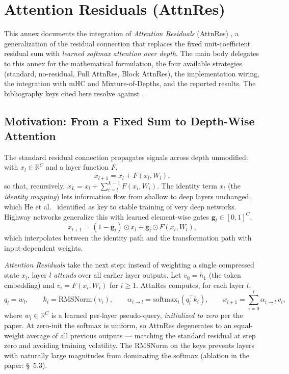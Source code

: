 \section{Attention Residuals (AttnRes)}
\label{sec:annex-attnres}

This annex documents the integration of \emph{Attention Residuals}
(AttnRes) \citep{sun_attnres_2026}, a generalization of the residual
connection that replaces the fixed unit-coefficient residual sum with
\emph{learned softmax attention over depth}. The main body delegates
to this annex for the mathematical formulation, the four available
strategies (standard, no-residual, Full AttnRes, Block AttnRes), the
implementation wiring, the integration with mHC and Mixture-of-Depths,
and the reported results. The bibliography keys cited here resolve
against .

\subsection{Motivation: From a Fixed Sum to Depth-Wise Attention}

The standard residual connection \citep{he_deep_2016} propagates signals
across depth unmodified: with $x_l \in \mathbb{R}^{C}$ and a layer
function $F$,
\[
x_{l+1} = x_l + F(x_l, W_l),
\]
so that, recursively,
$x_L = x_l + \sum_{i=l}^{L-1} F(x_i, W_i)$. The identity term $x_l$
(the \emph{identity mapping}) lets information flow from shallow to deep
layers unchanged, which He et al.~\citep{he_deep_2016} identified as key
to stable training of very deep networks. Highway networks
\citep{srivastava_highway_2015} generalize this with learned element-wise
gates $\mathbf{g}_l \in [0, 1]^{C}$,
\[
x_{l+1} = (1 - \mathbf{g}_l) \odot x_l + \mathbf{g}_l \odot F(x_l, W_l),
\]
which interpolates between the identity path and the transformation
path with input-dependent weights.

\emph{Attention Residuals} \citep{sun_attnres_2026} take the next step:
instead of weighting a single compressed state $x_l$, layer $l$
\emph{attends} over all earlier layer outputs. Let
$v_0 = h_1$ (the token embedding) and $v_i = F(x_i, W_i)$ for $i \ge 1$.
AttnRes computes, for each layer $l$,
\[
q_l = w_l, \qquad
k_i = \mathrm{RMSNorm}(v_i), \qquad
\alpha_{i \to l} = \mathrm{softmax}_i(q_l^{\top} k_i), \qquad
x_{l+1} = \sum_{i=0}^{l} \alpha_{i \to l} \, v_i,
\]
where $w_l \in \mathbb{R}^{C}$ is a learned per-layer pseudo-query,
\emph{initialized to zero} per the paper. At zero-init the softmax is
uniform, so AttnRes degenerates to an equal-weight average of all
previous outputs --- matching the standard residual at step zero and
avoiding training volatility. The RMSNorm on the keys prevents layers
with naturally large magnitudes from dominating the softmax
(ablation in the paper: \S~5.3).

